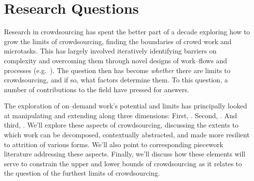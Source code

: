\documentclass[trackingWork]{subfiles}
\begin{document}
\section{Research Questions}

{Research in crowdsourcing has spent the better part of a decade
exploring how to grow the limits of crowdsourcing,
finding the boundaries of crowd work and microtasks.}
This has largely involved iteratively
identifying barriers on complexity and
overcoming them through novel designs of work--flows and processes (e.g.~\cite{bernsteinSoylent,foundry,crowdForgeKittur}).
The question then
has become \textit{whether} there are limits to crowdsourcing,
and if so, what factors determine them.
To this question, a number of contributions to the field have pressed for answers.

The exploration of on--demand work's potential and limits has principally looked at
manipulating and extending along three dimensions:
First, .
Second, .
And third, .
We'll explore these aspects of crowdsourcing,  discussing the extents to which work can be
decomposed,  contextually abstracted, and
made more resilient to attrition of various forms.
We'll also point to corresponding piecework literature addressing these aspects.
Finally, we'll discuss how these elements will serve
to constrain the upper and lower bounds of crowdsourcing as it relates
to the question of the furthest limits of crowdsourcing.


\notinsubfile{
  
  
  
}
\onlyinsubfile{
  \printbibliography{}
}
\end{document}
